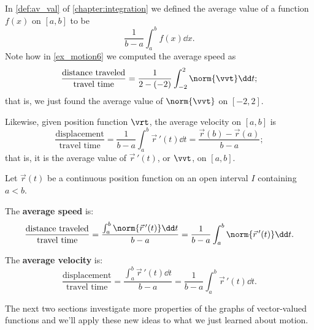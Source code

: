 In \autoref{def:av_val} of \autoref{chapter:integration} we defined the average value of a function $f(x)$ on $[a,b]$ to be
\[\frac{1}{b-a}\int_a^bf(x)\dd x.\]
Note how in \autoref{ex_motion6} we computed the average speed as
\[\frac{\text{distance traveled}}{\text{travel time}} = \frac1{2-(-2)}\int_{-2}^2\norm{\vvt}\dd t;\]
that is, we just found the average value of $\norm{\vvt}$ on $[-2,2]$.

Likewise, given position function $\vrt$, the average velocity on $[a,b]$ is
\[\frac{\text{displacement}}{\text{travel time}} = \frac1{b-a}\int_a^b \vec{r}\,'(t)\dd t = \frac{\vec r(b)-\vec r(a)}{b-a};\]
that is, it is the average value of $\vec r\,'(t)$, or $\vvt$, on $[a,b]$.

\begin{keyidea}\label{idea:average_speed_velocity}
Let $\vec r(t)$ be a continuous position function on an open interval $I$ containing $a<b$.\bigskip

The \textbf{average speed} is:
\[\frac{\text{distance traveled}}{\text{travel time}} = \frac{\int_a^b \norm{\vec{r}\,'(t)}\dd t}{b-a} = \frac1{b-a}\int_a^b\norm{\vec{r}\,'(t)}\dd t.\]

The \textbf{average velocity} is:
\[\frac{\text{displacement}}{\text{travel time}} = \frac{\int_a^b \vec{r}\,'(t)\dd t}{b-a} = \frac1{b-a}\int_a^b\vec{r}\,'(t)\dd t.\]
\end{keyidea}

The next two sections investigate more properties of the graphs of vector-valued functions and we'll apply these new ideas to what we just learned about motion.

